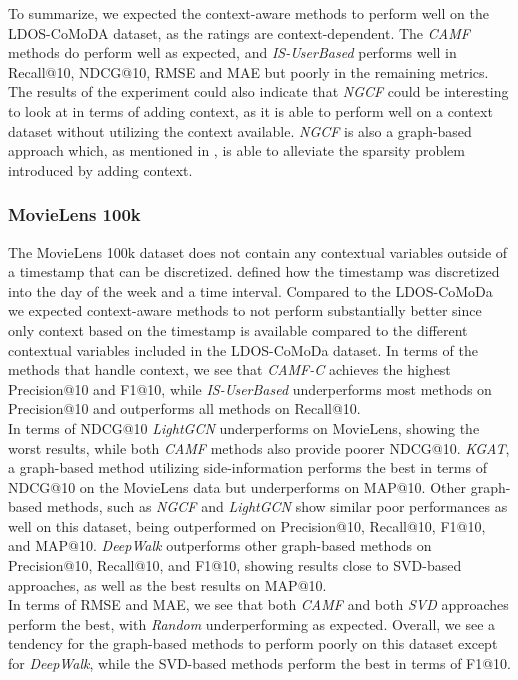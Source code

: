 To summarize, we expected the context-aware methods to perform well on the LDOS-CoMoDA dataset, as the ratings are context-dependent. 
The \textit{CAMF} methods do perform well as expected, and \textit{IS-UserBased} performs well in Recall@10, NDCG@10, RMSE and MAE but poorly in the remaining metrics.
The results of the experiment could also indicate that \textit{NGCF} could be interesting to look at in terms of adding context, as it is able to perform well on a context dataset without utilizing the context available. 
\textit{NGCF} is also a graph-based approach which, as mentioned in , is able to alleviate the sparsity problem introduced by adding context.


\subsubsection{MovieLens 100k}
The MovieLens 100k dataset does not contain any contextual variables outside of a timestamp that can be discretized.
 defined how the timestamp was discretized into the day of the week and a time interval.
Compared to the LDOS-CoMoDa we expected context-aware methods to not perform substantially better since only context based on the timestamp is available compared to the different contextual variables included in the LDOS-CoMoDa dataset. 
In terms of the methods that handle context, we see that \textit{CAMF-C} achieves the highest Precision@10 and F1@10, while \textit{IS-UserBased} underperforms most methods on Precision@10 and outperforms all methods on Recall@10.
\\
In terms of NDCG@10 \textit{LightGCN} underperforms on MovieLens, showing the worst results, while both \textit{CAMF} methods also provide poorer NDCG@10.
\textit{KGAT}, a graph-based method utilizing side-information performs the best in terms of NDCG@10 on the MovieLens data but underperforms on MAP@10.
Other graph-based methods, such as \textit{NGCF} and \textit{LightGCN} show similar poor performances as well on this dataset, being outperformed on Precision@10, Recall@10, F1@10, and MAP@10.
\textit{DeepWalk} outperforms other graph-based methods on Precision@10, Recall@10, and F1@10, showing results close to SVD-based approaches, as well as the best results on MAP@10.
\\
In terms of RMSE and MAE, we see that both \textit{CAMF} and both \textit{SVD} approaches perform the best, with \textit{Random} underperforming as expected.
Overall, we see a tendency for the graph-based methods to perform poorly on this dataset except for \textit{DeepWalk}, while the SVD-based methods perform the best in terms of F1@10.


